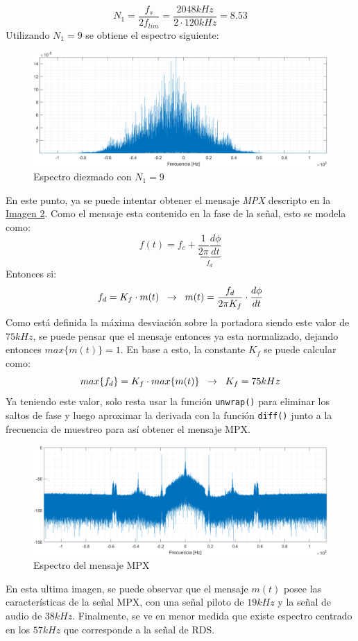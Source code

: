 $$
N_{1} = \frac{f_s}{2f_{lim}} = \frac{2048kHz}{2 \cdot 120kHz} = 8.53
$$
Utilizando $N_{1}=9$ se obtiene el espectro siguiente:
\begin{figure}[H]
    \centering
    \includegraphics[width=\columnwidth]{images/2.3-diezmando.png}
    \caption{Espectro diezmado con $N_{1}=9$}
    \label{fig:imagen6}
\end{figure}
En este punto, ya se puede intentar obtener el mensaje \textit{MPX} descripto en la \hyperref[fig:imagen2]{Imagen 2}. Como el mensaje esta contenido en la fase de la señal, esto se modela como:
$$
f(t) = f_{c} + \underbrace{\dfrac{1}{2\pi} \dfrac{d\phi}{dt}}_{f_{d}}
$$
Entonces si:
$$
f_{d} = K_{f} \cdot m(t)
\hspace{2mm}\to\hspace{2mm}
m(t) = \dfrac{f_{d}}{2\pi K_{f}} \cdot \dfrac{d\phi}{dt}
$$
Como está definida la máxima desviación sobre la portadora siendo este valor de $75kHz$, se puede pensar que el mensaje entonces ya esta normalizado, dejando entonces $max\{m(t)\}=1$. En base a esto, la constante $K_{f}$ se puede calcular como:
$$
max\{f_{d}\} = K_{f} \cdot max\{m(t)\}
\hspace{2mm}\to\hspace{2mm}
K_{f} = 75kHz
$$
Ya teniendo este valor, solo resta usar la función \texttt{unwrap()} para eliminar los saltos de fase y luego aproximar la derivada con la función \texttt{diff()} junto a la frecuencia de muestreo para así obtener el mensaje MPX.
\begin{figure}[H]
    \centering
    \includegraphics[width=\columnwidth]{images/2.4-mpx-completo.png}
    \caption{Espectro del mensaje MPX}
    \label{fig:imagen7}
\end{figure}
En esta ultima imagen, se puede observar que el mensaje $m(t)$ posee las características de la señal MPX, con una señal piloto de $19kHz$ y la señal de audio de $38kHz$. Finalmente, se ve en menor medida que existe espectro centrado en los $57kHz$ que corresponde a la señal de RDS.

